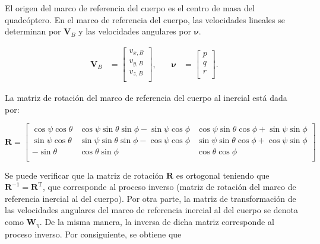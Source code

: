 \documentclass[11pt]{exam}
\begin{document}
        El origen del marco de referencia del cuerpo es el centro de masa del quadc\'optero. En el marco de referencia del cuerpo, las velocidades lineales se determinan por $\boldsymbol{V}_B$ y las velocidades angulares por $\boldsymbol{\nu}$.

        \begin{align}
            \boldsymbol{V}_B &= 
            \left[{
                \begin{array}{c}
                    v_{x,B} \\
                    v_{y,B} \\
                    v_{z,B} \\
                \end{array} 
            }\right],
            &\quad
            \boldsymbol{\nu} &= 
            \left[{
                \begin{array}{c}
                    p \\
                    q \\
                    r \\
                \end{array} 
            }\right].
        \end{align}

        La matriz de rotación del marco de referencia del cuerpo al inercial está dada por:

        \begin{equation}
            \boldsymbol{R} = 
            \left[{
                \begin{array}{ccc}
                    \cos{\psi}\cos{\theta}  & 
                    \cos{\psi}\sin{\theta}\sin{\phi} - \sin{\psi}\cos{\phi}    &
                    \cos{\psi}\sin{\theta}\cos{\phi} + \sin{\psi}\sin{\phi}    \\
                    \sin{\psi}\cos{\theta}  & 
                    \sin{\psi}\sin{\theta}\sin{\phi} - \cos{\psi}\cos{\phi}    &
                    \sin{\psi}\sin{\theta}\cos{\phi} + \cos{\psi}\sin{\phi}    \\
                    -\sin{\theta}           &
                    \cos{\theta}\sin{\phi}  &
                    \cos{\theta}\cos{\phi}  \\
                \end{array} 
            }\right]
        \end{equation}

        Se puede verificar que la matriz de rotación $\boldsymbol{R}$ es ortogonal teniendo que $\boldsymbol{R}^{-1} = \boldsymbol{R}^{\mathrm{T}}$, que corresponde al proceso inverso (matriz de rotación del marco de referencia inercial al del cuerpo). Por otra parte, la matriz de transformación de las velocidades angulares del marco de referencia inercial al del cuerpo se denota como $\boldsymbol{W}_{\eta}$. De la misma manera, la inversa de dicha matriz corresponde al proceso inverso. Por consiguiente, se obtiene que
    
\end{document}
